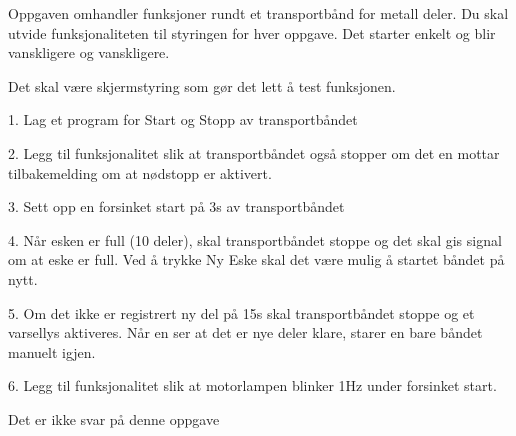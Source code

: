 


Oppgaven omhandler funksjoner rundt et transportbånd for metall deler.
Du skal utvide funksjonaliteten til styringen for hver oppgave. Det
starter enkelt og blir vanskligere og vanskligere. 


Det skal være skjermstyring som gør det lett å test funksjonen. 

1. Lag et program for Start og Stopp av transportbåndet 

2. Legg til funksjonalitet slik at transportbåndet også stopper om
det en mottar tilbakemelding om at nødstopp er aktivert. 

3. Sett opp en forsinket start på 3s av transportbåndet 

4. Når esken er full (10 deler), skal transportbåndet stoppe og det
skal gis signal om at eske er full. Ved å trykke Ny Eske skal det
være mulig å startet båndet på nytt. 

5. Om det ikke er registrert ny del på 15s skal transportbåndet stoppe
og et varsellys aktiveres. Når en ser at det er nye deler klare, starer
en bare båndet manuelt igjen. 

6. Legg til funksjonalitet slik at motorlampen blinker 1Hz under forsinket
start. 

\vskip 10pt





Det er ikke svar på denne oppgave












